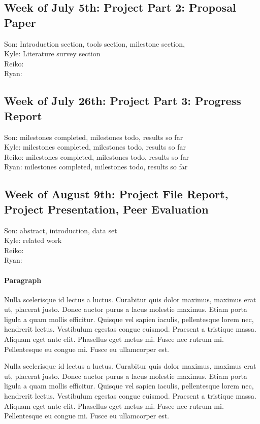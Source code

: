 \documentclass[11pt,sigconf]{acmart}
\begin{document}
\subsection{Week of July 5th: Project Part 2: Proposal Paper}

Son:  Introduction section, tools section, milestone section,  \\
Kyle: Literature survey section \\
Reiko: \\
Ryan: \\

\subsection{Week of July 26th: Project Part 3: Progress Report}

Son: milestones completed, milestones todo, results so far \\
Kyle: milestones completed, milestones todo, results so far \\
Reiko: milestones completed, milestones todo, results so far \\
Ryan: milestones completed, milestones todo, results so far \\

\subsection{Week of August 9th: Project File Report, Project Presentation, Peer Evaluation}

Son: abstract, introduction, data set\\
Kyle: related work\\
Reiko: \\
Ryan: \\


\paragraph{Paragraph}

Nulla scelerisque id lectus a luctus.
Curabitur quis dolor maximus, maximus erat ut, placerat justo.
Donec auctor purus a lacus molestie maximus.
Etiam porta ligula a quam mollis efficitur.
Quisque vel sapien iaculis, pellentesque lorem nec, hendrerit lectus.
Vestibulum egestas congue euismod.
Praesent a tristique massa.
Aliquam eget ante elit.
Phasellus eget metus mi.
Fusce nec rutrum mi.
Pellentesque eu congue mi.
Fusce eu ullamcorper est.

Nulla scelerisque id lectus a luctus.
Curabitur quis dolor maximus, maximus erat ut, placerat justo.
Donec auctor purus a lacus molestie maximus.
Etiam porta ligula a quam mollis efficitur.
Quisque vel sapien iaculis, pellentesque lorem nec, hendrerit lectus.
Vestibulum egestas congue euismod.
Praesent a tristique massa.
Aliquam eget ante elit.
Phasellus eget metus mi.
Fusce nec rutrum mi.
Pellentesque eu congue mi.
Fusce eu ullamcorper est.



 
\end{document}
